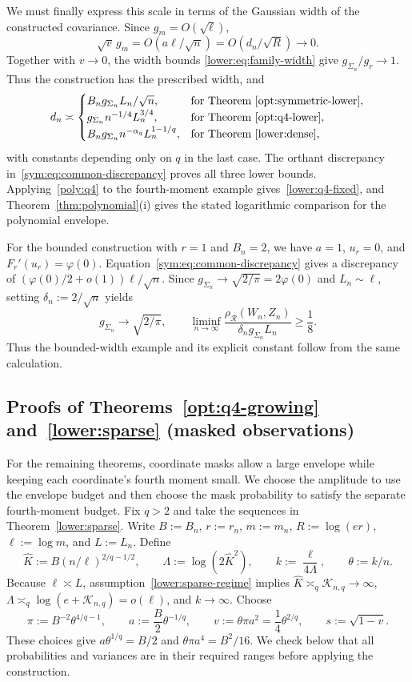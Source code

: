 \documentclass[11pt,letterpaper,twoside,leqno]{article}
\theoremstyle{bookplain}
\theoremstyle{bookremark}
\newcommand{\rh}{\rho_{\mathcal R}}
\begin{document}
We must finally express this scale in terms of the Gaussian width
of the constructed covariance. Since $g_m=O(\sqrt\ell)$,
\[
 \sqrt v\,g_m=O(a\ell/\sqrt n)=O(d_n/\sqrt R)\to0.
\]
Together with $v\to0$, the width bounds
\eqref{lower:eq:family-width} give $g_{\Sigma_n}/g_r\to1$.
Thus the construction has the prescribed width, and
\[
 d_n\asymp
 \begin{cases}
 B_n g_{\Sigma_n}L_n/\sqrt n,
   &\text{for Theorem~\ref{opt:symmetric-lower}},\\
 g_{\Sigma_n}n^{-1/4}L_n^{3/4},
   &\text{for Theorem~\ref{opt:q4-lower}},\\
 B_n g_{\Sigma_n}n^{-\alpha_q}L_n^{1-1/q},
   &\text{for Theorem~\ref{lower:dense}},
 \end{cases}
\]
with constants depending only on $q$ in the last case.
The orthant discrepancy in~\eqref{sym:eq:common-discrepancy}
proves all three lower bounds. Applying~\eqref{poly:q4} to the
fourth-moment example gives~\eqref{lower:q4-fixed}, and
Theorem~\ref{thm:polynomial}\textup{(i)} gives the stated
logarithmic comparison for the polynomial envelope.

For the bounded construction with $r=1$ and $B_n=2$, we have
$a=1$, $u_r=0$, and $F_r'(u_r)=\varphi(0)$.
Equation~\eqref{sym:eq:common-discrepancy} gives a discrepancy
of $(\varphi(0)/2+o(1))\ell/\sqrt n$. Since
$g_{\Sigma_n}\to\sqrt{2/\pi}=2\varphi(0)$ and $L_n\sim\ell$,
setting $\delta_n:=2/\sqrt n$ yields
\[
 g_{\Sigma_n}\to\sqrt{2/\pi},\qquad
 \liminf_{n\to\infty}
 \frac{\rh(W_n,Z_n)}{\delta_n g_{\Sigma_n}L_n}\ge\frac18.
\]
Thus the bounded-width example and its explicit constant follow
from the same calculation.

\subsection{Proofs of Theorems~\ref*{opt:q4-growing} and~\ref*{lower:sparse} (masked observations)}
\label{app:q4-growing}

For the remaining theorems, coordinate masks allow a large envelope
while keeping each coordinate's fourth moment small. We choose the
amplitude to use the envelope budget and then choose the mask
probability to satisfy the separate fourth-moment budget.
Fix $q>2$ and take the sequences in Theorem~\ref{lower:sparse}.
Write $B:=B_n$, $r:=r_n$, $m:=m_n$, $R:=\log(er)$,
$\ell:=\log m$, and $L:=L_n$. Define
\[
 \widehat K:=B(n/\ell)^{2/q-1/2},\qquad
 \Lambda:=\log(2\widehat K^2),\qquad
 k:=\frac{\ell}{4\Lambda},\qquad \theta:=k/n.
\]
Because $\ell\asymp L$, assumption~\eqref{lower:sparse-regime}
implies $\widehat K\asymp_q\mathcal K_{n,q}\to\infty$,
$\Lambda\asymp_q\log(e+\mathcal K_{n,q})=o(\ell)$,
and $k\to\infty$. Choose
\begin{equation}
 \pi:=B^{-2}\theta^{4/q-1},\qquad
 a:=\frac B2\theta^{-1/q},\qquad
 v:=\theta\pi a^2=\frac14\theta^{2/q},\qquad s:=\sqrt{1-v}.
 \label{q4:eq:sparse-parameters}
\end{equation}
These choices give $a\theta^{1/q}=B/2$ and
$\theta\pi a^4=B^2/16$. We check below that all probabilities
and variances are in their required ranges before applying the
construction.
\end{document}
